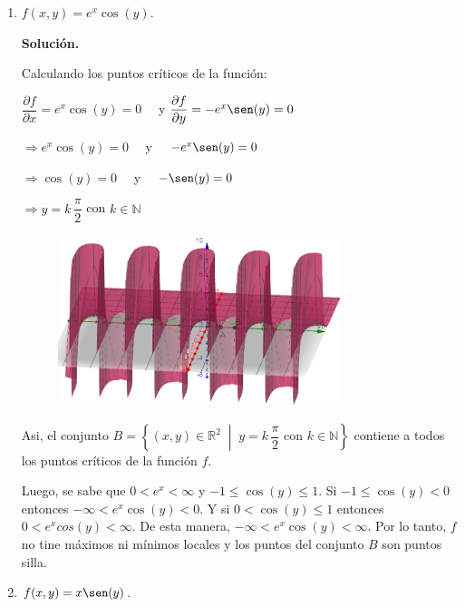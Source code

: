 \documentclass[fleqn, 12pt]{article}
\newcommand{\derivadaparcial}[2]{\dfrac{\partial {#1}}{\partial {#2}}}
\newcommand{\talque}{\; \middle | \;}
\begin{document}
\begin{enumerate}
\begin{enumerate}
            \item $ f(x,y) = e^x \cos (y) $.
            
            \textbf{Solución.}

            Calculando los puntos críticos de la función:

            $ \derivadaparcial{f}{x} = e^x \cos (y) = 0 \quad $ y $ \derivadaparcial{f}{y} = -e^x \sen (y) = 0 $

            $ \Longrightarrow e^x \cos (y) = 0 \quad $ y $ \quad -e^x \sen (y) = 0 $

            $ \Longrightarrow \cos (y) = 0 \quad $ y $ \quad - \sen (y) = 0 $

            $ \Longrightarrow y = k \, \dfrac{\pi}{2} $ con $ k \in \mathbb{N} $

            \begin{figure}[h!]
                \centering
                \includegraphics[height = 5cm]{Cuarto.png}
            \end{figure}

            Asi, el conjunto $ B = \left\lbrace (x,y) \in \mathbb{R}^2 \talque y = k \, \dfrac{\pi}{2} \text{ con } k \in \mathbb{N} \right\rbrace $ contiene a todos los puntos críticos de la función $ f $.

            Luego, se sabe que $ 0 < e^x < \infty $ y $ -1 \leq \cos (y) \leq 1 $. Si $ -1 \leq \cos (y) < 0 $ entonces $ - \infty < e^x \cos (y) < 0 $. Y si $ 0 < \cos (y) \leq 1 $ entonces $ 0 < e^x cos(y) < \infty $. De esta manera, $ - \infty < e^x \cos (y) < \infty $. Por lo tanto, $ f $ no tine máximos ni mínimos locales y los puntos del conjunto $ B $ son puntos silla.

            \item $ f(x,y) = x \sen (y) $.
            

\end{enumerate}
\end{enumerate}
\end{document}
